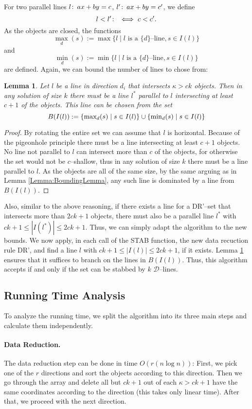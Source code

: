 \documentclass[12pt]{article}
\newtheorem{lemma}[definition]{Lemma}
\newcommand{\co}{\colon\thinspace}
\newcommand{\calD}{\mathcal{D}}
\begin{document}
For two parallel lines $l\co ax + by = c$, $l'\co ax + by = c'$, we define \[ l < l' \co\iff c < c'. \] As the objects are closed, the functions 
\[ \max_{d}(s) := \max\{l \mid l \text{ is a $\{d\}$--line}, s \in I(l)\}\]
and 
\[ \min_{d}(s) := \min\{l \mid l \text{ is a $\{d\}$--line}, s \in I(l)\} \] 
are defined. Again, we can bound the number of lines to chose from:
\begin{lemma}\label{Lemma:BranchingNew} Let $l$ be a line in direction $d_i$ that intersects $\kappa > ck$ objects. Then in any solution of size $k$ there must be a line $l^*$ parallel to $l$ intersecting at least $c + 1$ of the objects. This line can be chosen from the set
\[ B(I(l)) := \left\{ \textnormal{max}_{d}(s) \mid s \in I(l) \right\} \cup \left\{ \textnormal{min}_{d}(s) \mid s \in I(l) \right\} \]
\end{lemma}
\begin{proof}
By rotating the entire set we can assume that $l$ is horizontal. Because of the pigeonhole principle there must be a line intersecting at least $c+1$ objects. No line not parallel to $l$ can intersect more than $c$ of the objects, for otherwise the set would not be $c$--shallow, thus in any solution of size $k$ there must be a line parallel to $l$. As the objects are all of the same size, by the same arguing as in Lemma \ref{Lemma:BoundingLemma}, any such line is dominated by a line from $B(I(l))$. 
\end{proof}

Also, similar to the above reasoning, if there exists a line for a DR'--set that intersects more than $2ck + 1$ objects, there must also be a parallel line $l^*$ with $ck + 1 \leq |I(l^*)| \leq 2ck + 1$. Thus, we can simply adapt the algorithm to the new bounds. We now apply, in each call of the STAB function, the new data recuction rule DR', and find a line $l$ with $ck + 1 \leq |I(l)| \leq 2ck + 1$, if it exists. Lemma \ref{Lemma:BranchingNew} ensures that it suffices to branch on the lines in $B(I(l))$. Thus, this algorithm accepts if and only if the set can be stabbed by $k$ $\calD$--lines.

\subsection{Running Time Analysis}
To analyze the running time, we split the algorithm into its three main steps and calculate them independently.
\paragraph{Data Reduction.}
The data reduction step can be done in time $O\left( r(n \log n) \right)$: First, we pick one of the $r$ directions and sort the objects according to this direction. Then we go through the array and delete all but $ck + 1$ out of each $\kappa > ck + 1$ have the same coordinates according to the direction (this takes only linear time). After that, we proceed with the next direction.
\end{document}
